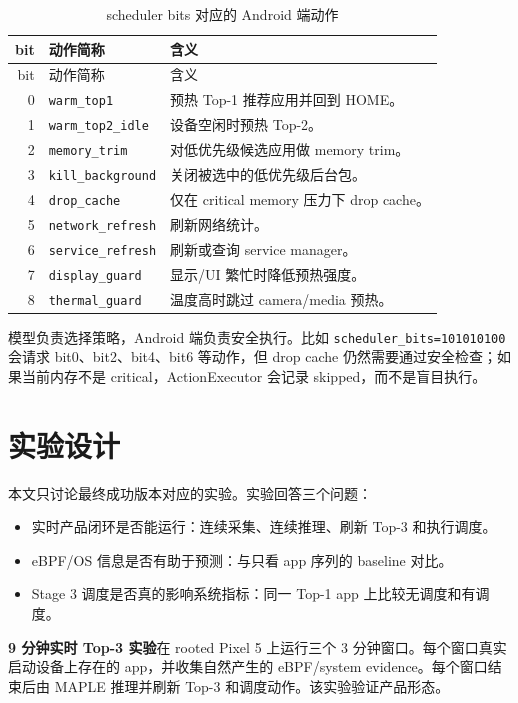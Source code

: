\begin{longtable}{r p{} p{}}
\caption{scheduler bits 对应的 Android 端动作}\\
\toprule
bit & 动作简称 & 含义 \\
\midrule
\endfirsthead
\toprule
bit & 动作简称 & 含义 \\
\midrule
\endhead
0 & \texttt{warm\_top1} & 预热 Top-1 推荐应用并回到 HOME。\\
1 & \texttt{warm\_top2\_idle} & 设备空闲时预热 Top-2。\\
2 & \texttt{memory\_trim} & 对低优先级候选应用做 memory trim。\\
3 & \texttt{kill\_background} & 关闭被选中的低优先级后台包。\\
4 & \texttt{drop\_cache} & 仅在 critical memory 压力下 drop cache。\\
5 & \texttt{network\_refresh} & 刷新网络统计。\\
6 & \texttt{service\_refresh} & 刷新或查询 service manager。\\
7 & \texttt{display\_guard} & 显示/UI 繁忙时降低预热强度。\\
8 & \texttt{thermal\_guard} & 温度高时跳过 camera/media 预热。\\
\bottomrule
\end{longtable}

模型负责选择策略，Android 端负责安全执行。比如 \texttt{scheduler\_bits=101010100} 会请求 bit0、bit2、bit4、bit6 等动作，但 drop cache 仍然需要通过安全检查；如果当前内存不是 critical，ActionExecutor 会记录 skipped，而不是盲目执行。

\section{实验设计}

本文只讨论最终成功版本对应的实验。实验回答三个问题：

\begin{itemize}
  \item 实时产品闭环是否能运行：连续采集、连续推理、刷新 Top-3 和执行调度。
  \item eBPF/OS 信息是否有助于预测：与只看 app 序列的 baseline 对比。
  \item Stage 3 调度是否真的影响系统指标：同一 Top-1 app 上比较无调度和有调度。
\end{itemize}

\textbf{9 分钟实时 Top-3 实验}在 rooted Pixel 5 上运行三个 3 分钟窗口。每个窗口真实启动设备上存在的 app，并收集自然产生的 eBPF/system evidence。每个窗口结束后由 MAPLE 推理并刷新 Top-3 和调度动作。该实验验证产品形态。


